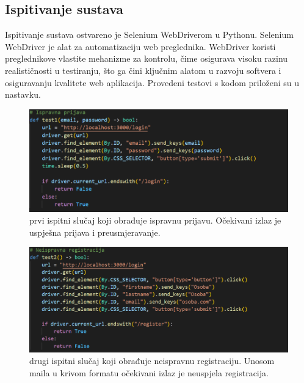 			 

			\subsection{Ispitivanje sustava}
Ispitivanje sustava ostvareno je Selenium WebDriverom u Pythonu. Selenium WebDriver je alat za automatizaciju web preglednika. WebDriver koristi preglednikove vlastite mehanizme za kontrolu, čime osigurava visoku razinu realističnosti u testiranju, što ga čini ključnim alatom u razvoju softvera i osiguravanju kvalitete web aplikacija. Provedeni testovi s kodom priloženi su u nastavku.
\break

\begin{figure}[htp]
    \caption{prvi ispitni slučaj koji obrađuje ispravnu prijavu. Očekivani izlaz je uspješna prijava i preusmjeravanje.}
    \includegraphics[scale=0.5]{dijagrami/test1.png}
    \centering
    
\end{figure}
\break

\begin{figure}[htp]
    \caption{drugi ispitni slučaj koji obrađuje neispravnu registraciju. Unosom maila u krivom formatu očekivani izlaz je neuspjela registracija.}
    \includegraphics[scale=0.5]{dijagrami/test2.png}
    \centering
    
\end{figure}
\break


